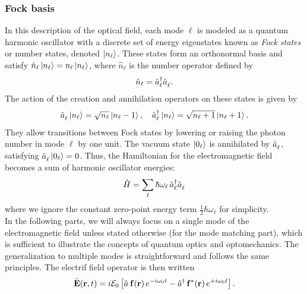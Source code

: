 \subsubsection{Fock basis}
In this description of the optical field, each mode $\ell$ is modeled as a quantum harmonic oscillator with a discrete set of energy eigenstates known as \textit{Fock states} or number states, denoted $\ket{n_\ell}$. These states form an orthonormal basis and satisfy $\hat{n}_{\ell} \ket{n_\ell} = n_\ell \ket{n_\ell}$, where $\hat{n}_{\ell}$ is the number operator defined by
\[
\hat{n}_{\ell} = \hat{a}_{\ell}^\dagger \hat{a}^{\vphantom{\dagger}}_{\ell}.
\]
The action of the creation and annihilation operators on these states is given by
\[
\hat{a}^{\vphantom{\dagger}}_{\ell} \ket{n_\ell} = \sqrt{n_\ell} \ket{n_\ell - 1}, \quad
\hat{a}_{\ell}^\dagger \ket{n_\ell} = \sqrt{n_\ell + 1} \ket{n_\ell + 1}.
\]
They allow transitions between Fock states by lowering or raising the photon number in mode $\ell$ by one unit. The vacuum state $\ket{0_\ell}$ is annihilated by $\hat{a}^{\vphantom{\dagger}}_{\ell}$, satisfying $\hat{a}^{\vphantom{\dagger}}_{\ell} \ket{0_\ell} = 0$. Thus, the Hamiltonian for the electromagnetic field becomes a sum of harmonic oscillator energies:
\begin{equation}
\hat{H} = \sum_\ell \hbar \omega_{\ell} \, \hat{a}_{\ell}^\dagger \hat{a}^{\vphantom{\dagger}}_{\ell} 
\end{equation}
where we ignore the constant zero-point energy term $\frac{1}{2} \hbar \omega_{\ell}$ for simplicity. \\

In the following parts, we will always focus on a single mode of the electromagnetic field unless stated otherwise (for the mode matching part), which is sufficient to illustrate the concepts of quantum optics and optomechanics. The generalization to multiple modes is straightforward and follows the same principles. The electrif field operator is then written
\begin{equation}
\hat{\mathbf{E}}(\mathbf{r}, t)
= i \mathcal{E}_0
\left[ \hat{a}^{\vphantom{\dagger}}\,\mathbf{f}(\mathbf{r})\,e^{-i\omega_0 t}
- \hat{a}^\dagger\,\mathbf{f}^*(\mathbf{r})\,e^{+i\omega_0 t} \right].
\end{equation}


